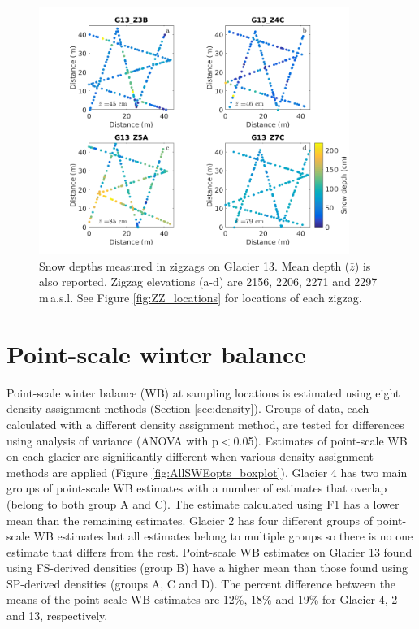 \documentclass{sfuthesis}
\begin{document}
\begin{figure}[H] 
	\centering
	 \includegraphics[width=0.9\textwidth]{ZigzagDepth_G13.png}%
	\caption{Snow depths measured in zigzags on Glacier 13. Mean depth ($\bar{z}$) is also reported. Zigzag elevations (a-d) are 2156, 2206, 2271 and 2297 \,m\,a.s.l. See Figure \ref{fig:ZZ_locations} for locations of each zigzag.}
	\label{fig:ZZ_G13}
\end{figure}


\section{Point-scale winter balance}

Point-scale winter balance (WB) at sampling locations is estimated using eight density assignment methods (Section \ref{sec:density}). Groups of data, each calculated with a different density assignment method, are tested for differences using analysis of variance (ANOVA with p$<$0.05). Estimates of point-scale WB on each glacier are significantly different when various density assignment methods are applied (Figure \ref{fig:AllSWEopts_boxplot}). Glacier 4 has two main groups of point-scale WB estimates with a number of estimates that overlap (belong to both group A and C). The estimate calculated using F1 has a lower mean than the remaining estimates. Glacier 2 has four different groups of point-scale WB estimates but all estimates belong to multiple groups so there is no one estimate that differs from the rest. Point-scale WB estimates on Glacier 13 found using FS-derived densities (group B) have a higher mean than those found using SP-derived densities (groups A, C and D). The percent difference between the means of the point-scale WB estimates are 12\%, 18\% and 19\%  for Glacier 4, 2 and 13, respectively. 
\end{document}
